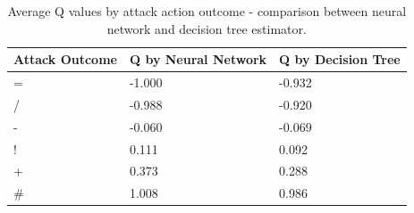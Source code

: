 \documentclass[12pt,letter]{article}
\begin{document}
	\begin{table}[]
		\centering
		\begin{tabular}{lll}
			\textbf{Attack Outcome} & \textbf{Q by Neural Network} & \textbf{Q by Decision Tree} \\ \hline
			=                        & -1.000                       & -0.932                      \\
			/                        & -0.988                       & -0.920                      \\
			-                        & -0.060                       & -0.069                      \\
			!                        & 0.111                        & 0.092                       \\
			+                        & 0.373                        & 0.288                       \\
			\#                       & 1.008                        & 0.986                      
		\end{tabular}
		\caption{Average Q values by attack action outcome - comparison between neural network and decision tree estimator.}
		\label{tab:action_outcomes}
	\end{table}
	
	\newpage
	
	
	
\end{document}
